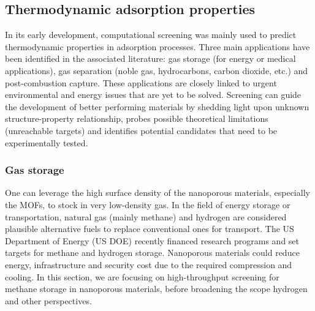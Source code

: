 \documentclass[main.tex]{subfiles}
\begin{document}
\subsection{Thermodynamic adsorption properties}

In its early development, computational screening was mainly used to predict thermodynamic properties in adsorption processes. Three main applications have been identified in the associated literature: gas storage (for energy or medical applications), gas separation (noble gas, hydrocarbons, carbon dioxide, etc.) and post-combustion  capture. These applications are closely linked to urgent environmental and energy issues that are yet to be solved. Screening can guide the development of better performing materials by shedding light upon unknown structure-property relationship, probes possible theoretical limitations (unreachable targets) and identifies potential candidates that need to be experimentally tested.

\subsubsection{Gas storage}

One can leverage the high surface density of the nanoporous materials, especially the MOFs, to stock in very low-density gas. In the field of energy storage or transportation, natural gas (mainly methane) and hydrogen are considered plausible alternative fuels to replace conventional ones for transport. The US Department of Energy (US DOE) recently financed research programs and set targets for methane and hydrogen storage. Nanoporous materials could reduce energy, infrastructure and security cost due to the required compression and cooling. In this section, we are focusing on high-throughput screening for methane storage in nanoporous materials, before broadening the scope hydrogen and other perspectives.
\end{document}
